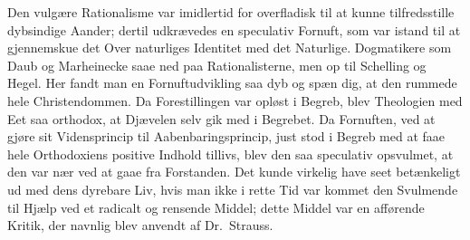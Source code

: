 \documentclass[12pt,a4paper]{article}
\begin{document}
Den vulgære Rationalisme var imidlertid for overfladisk til
at kunne tilfredsstille dybsindige Aander; dertil udkrævedes en
speculativ Fornuft, som var istand til at gjennemskue det Over\-%
naturliges Identitet med det Naturlige. Dogmatikere som Daub
og Marheinecke saae ned paa Rationalisterne, men op til Schelling
og Hegel. Her fandt man en Fornuftudvikling saa dyb og spæn\-%
dig, at den rummede hele Christendommen. Da Forestillingen
var opløst i Begreb, blev Theologien med Eet saa orthodox, at
Djævelen selv gik med i Begrebet. Da Fornuften, ved at gjøre
sit Vidensprincip til Aabenbaringsprincip, just stod i Begreb med
at faae hele Orthodoxiens positive Indhold tillivs, blev den saa
speculativ opsvulmet, at den var nær ved at gaae fra Forstanden.
Det kunde virkelig have seet betænkeligt ud med dens dyrebare
Liv, hvis man ikke i rette Tid var kommet den Svulmende til
Hjælp ved et radicalt og rensende Middel; dette Middel var en
afførende Kritik, der navnlig blev anvendt af Dr.\ Strauss.
\end{document}
